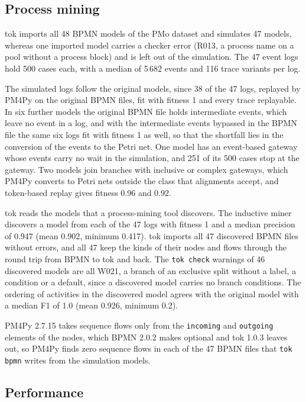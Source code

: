 \documentclass[11pt,a4paper]{article}
\begin{document}
\subsection{Process mining}

tok imports all 48 BPMN models of the PMo dataset and simulates 47 models, whereas one imported model carries a checker error (R013, a process name on a pool without a process block) and is left out of the simulation. The 47 event logs hold 500 cases each, with a median of 5\,682 events and 116 trace variants per log.

The simulated logs follow the original models, since 38 of the 47 logs, replayed by PM4Py on the original BPMN files, fit with fitness 1 and every trace replayable. In six further models the original BPMN file holds intermediate events, which leave no event in a log, and with the intermediate events bypassed in the BPMN file the same six logs fit with fitness 1 as well, so that the shortfall lies in the conversion of the events to the Petri net. One model has an event-based gateway whose events carry no wait in the simulation, and 251 of its 500 cases stop at the gateway. Two models join branches with inclusive or complex gateways, which PM4Py converts to Petri nets outside the class that alignments accept, and token-based replay gives fitness 0.96 and 0.92.

tok reads the models that a process-mining tool discovers. The inductive miner discovers a model from each of the 47 logs with fitness 1 and a median precision of 0.947 (mean 0.902, minimum 0.417). tok imports all 47 discovered BPMN files without errors, and all 47 keep the kinds of their nodes and flows through the round trip from BPMN to tok and back. The \texttt{tok check} warnings of 46 discovered models are all W021, a branch of an exclusive split without a label, a condition or a default, since a discovered model carries no branch conditions. The ordering of activities in the discovered model agrees with the original model with a median F1 of 1.0 (mean 0.926, minimum 0.2).

PM4Py 2.7.15 takes sequence flows only from the \texttt{incoming} and \texttt{outgoing} elements of the nodes, which BPMN 2.0.2 makes optional and tok 1.0.3 leaves out, so PM4Py finds zero sequence flows in each of the 47 BPMN files that \texttt{tok bpmn} writes from the simulation models.

\subsection{Performance}
\end{document}
